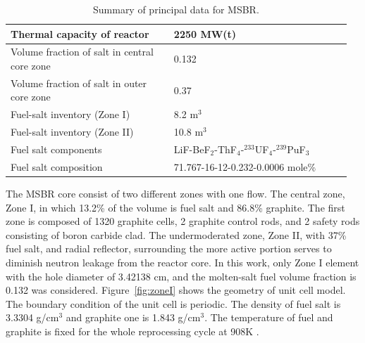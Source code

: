 \documentclass{anstrans}
\begin{document}
\captionsetup[table]{
  labelsep = newline,
  name = TABLE, 
  justification=justified,
  singlelinecheck=false,%
  labelsep=colon,%
  skip = \medskipamount}
\begin{table}[h!]
\begin{tabular}{p{0.46\linewidth} p{0.50\linewidth}} \toprule
Thermal capacity of reactor           & 2250 MW(t)
\\ \midrule
Volume fraction of salt in central core zone     & 0.132
\\ \midrule
Volume fraction of salt in outer core zone       & 0.37
\\ \midrule
Fuel-salt inventory (Zone I)                  & 8.2 m$^3$	
\\ \midrule
Fuel-salt inventory (Zone II)                 & 10.8 m$^3$	
\\ \midrule
Fuel salt components                  & LiF-BeF$_2$-ThF$_4$-$^{233}$UF$_4$-$^{239}$PuF$_3$	
\\ \midrule
Fuel salt composition                 & 71.767-16-12-0.232-0.0006 mole\%
\\
\bottomrule
\end{tabular}
  \caption{Summary of principal data for MSBR.}
  \label{tab:data}
\end{table}

The \gls{MSBR} core consist of two different zones with one flow. The central zone, Zone I, in which 13.2\% of the volume is fuel salt and 86.8\% graphite. The first zone is composed of 1320 graphite cells, 2 graphite control rods, and 2 safety rods consisting of boron carbide clad. The undermoderated zone, Zone II, with 37\% fuel salt, and radial reflector, surrounding the more active portion serves to diminish neutron leakage from the reactor core. In this work, only Zone I element with the hole diameter of 3.42138 cm, and the molten-salt fuel volume fraction is 0.132 was considered. Figure~\ref{fig:zoneI} shows the geometry of unit cell model. The boundary condition of the unit cell is periodic. The density of fuel salt is 3.3304 g/cm$^3$ and graphite one is 1.843 g/cm$^3$. The temperature of fuel and graphite is fixed for the whole reprocessing cycle at 908K \cite{robertson_conceptual_1971}.
\end{document}
